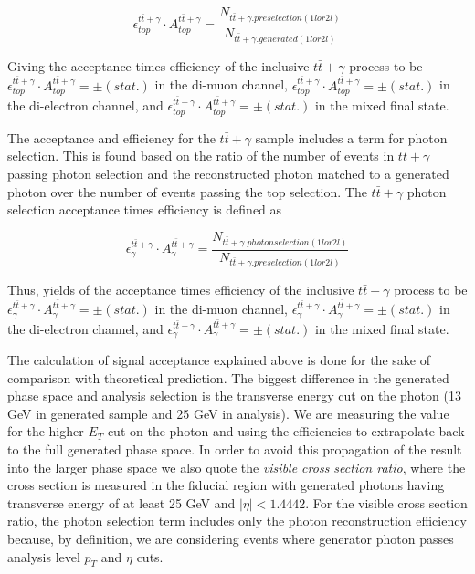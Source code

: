\begin{equation}
	\epsilon^{t\bar{t}+\gamma}_{top} \cdot A^{t\bar{t}+\gamma}_{top} = \frac{N_{t\bar{t}+\gamma.preselection(1lor2l)}}{N_{t\bar{t}+\gamma.generated(1lor2l)}} 
\end{equation}

Giving the acceptance times efficiency of the inclusive $t\bar{t}+\gamma$ process to be $\epsilon^{t\bar{t}+\gamma}_{top} \cdot A^{t\bar{t}+\gamma}_{top} =   \pm  (stat.)$ in the di-muon channel, $\epsilon^{t\bar{t}+\gamma}_{top} \cdot A^{t\bar{t}+\gamma}_{top} =  \pm  (stat.)$ in the di-electron channel, and $\epsilon^{t\bar{t}+\gamma}_{top} \cdot A^{t\bar{t}+\gamma}_{top} =  \pm  (stat.)$ in the mixed final state.

The acceptance and efficiency for the $t\bar{t}+\gamma$ sample includes a term for photon selection. This is found based on the ratio of the number of events in $t\bar{t}+\gamma$ passing photon selection and the reconstructed photon matched to a generated photon over the number of events passing the top selection. The $t\bar{t}+\gamma$ photon selection acceptance times efficiency is defined as

\begin{equation}
	\epsilon^{t\bar{t}+\gamma}_{\gamma} \cdot A^{t\bar{t}+\gamma}_{\gamma} = \frac{N_{t\bar{t}+\gamma.photonselection(1lor2l)}}{N_{t\bar{t}+\gamma.preselection(1lor2l)}} 
\end{equation}

Thus, yields of the acceptance times efficiency of the inclusive $t\bar{t}+\gamma$ process to be $\epsilon^{t\bar{t}+\gamma}_{\gamma} \cdot A^{t\bar{t}+\gamma}_{\gamma} =   \pm  (stat.)$ in the di-muon channel, $\epsilon^{t\bar{t}+\gamma}_{\gamma} \cdot A^{t\bar{t}+\gamma}_{\gamma} =  \pm  (stat.)$ in the di-electron channel, and $\epsilon^{t\bar{t}+\gamma}_{\gamma} \cdot A^{t\bar{t}+\gamma}_{\gamma} =  \pm  (stat.)$ in the mixed final state.

The calculation of signal acceptance explained above is done for the sake of comparison with theoretical prediction. The biggest difference in the generated phase space and analysis selection is the transverse energy cut on the photon (13 GeV in generated sample and 25 GeV in analysis). We are measuring the value for the higher $E_T$ cut on the photon and using the efficiencies to extrapolate back to the full generated phase space. In order to avoid this propagation of the result into the larger phase space we also quote the \emph{visible cross section ratio}, where the cross section is measured in the fiducial region with generated photons having transverse energy of at least 25 GeV and $| \eta | < 1.4442$. For the visible cross section ratio, the photon selection term includes only the photon reconstruction efficiency because, by definition, we are considering events where generator photon passes analysis level $p_T$ and $\eta$ cuts.

